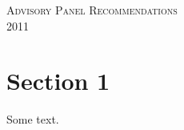 \documentclass[10pt,titlepage]{article}
\begin{document}
\begin{titlepage}

\begin{center}

\begin{figure}[!ht]
  \centering
  \fbox{\rule{0pt}{2in} \rule{0.9\linewidth}{0pt}}
\end{figure} 

\textsc{\LARGE Advisory Panel Recommendations}\\[1.5cm]

\textsc{\Large 2011}\\[0.5cm]

\vfill

\end{center}

\end{titlepage}

\section{Section 1}
Some text.
\end{document}
